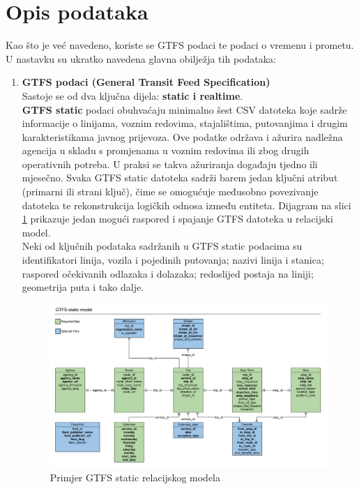 \documentclass[seminarskirad]{fer}
\begin{document}
\section{Opis podataka}
Kao što je već navedeno, koriste se GTFS podaci te podaci o vremenu i prometu.  
U nastavku su ukratko navedena glavna obilježja tih podataka:
\begin{enumerate}
	\item \textbf{GTFS podaci (General Transit Feed Specification)}\\
	Sastoje se od dva ključna dijela: \textbf{static i realtime}.\\
	\textbf{GTFS static} podaci obuhvaćaju minimalno šest CSV datoteka koje sadrže informacije o linijama, voznim redovima, stajalištima, putovanjima i drugim karakteristikama javnog prijevoza. Ove podatke održava i ažurira nadležna agencija u skladu s promjenama u voznim redovima ili zbog drugih operativnih potreba. U praksi se takva ažuriranja događaju tjedno ili mjesečno. Svaka GTFS static datoteka sadrži barem jedan ključni atribut (primarni ili strani ključ), čime se omogućuje međusobno povezivanje datoteka te rekonstrukcija logičkih odnosa između entiteta. Dijagram na slici \ref{slk:static} prikazuje jedan mogući raspored i spajanje GTFS datoteka u relacijski model.\\
	Neki od ključnih podataka sadržanih u GTFS static podacima su identifikatori linija, vozila i pojedinih putovanja; nazivi linija i stanica; raspored očekivanih odlazaka i dolazaka; redoslijed postaja na liniji; geometrija puta i tako dalje.
	
	\begin{figure}[htb]
		\centering
		\includegraphics[width=0.9\linewidth]{Figures/gtfs-model.png} 
		\caption{Primjer GTFS static relacijskog modela}
		\label{slk:static}
	\end{figure}
	

\end{enumerate}
\end{document}
